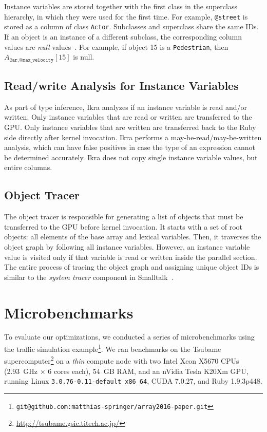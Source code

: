 \documentclass[preprint]{sigplanconf}
\begin{document}
Instance variables are stored together with the first class in the superclass hierarchy, in which they were used for the first time. For example, \texttt{@street} is stored as a column of class \texttt{Actor}. Subclasses and superclass share the same IDs. If an object is an instance of a different subclass, the corresponding column values are \emph{null} values~\cite{Mattis:2015:COI:2814228.2814230}. For example, if object 15 is a \texttt{Pedestrian}, then $A_{\texttt{Car}, \texttt{@max\_velocity}}[15]$ is null.

\subsection{Read/write Analysis for Instance Variables}
\label{sec:impl_copyback}
As part of type inference, Ikra analyzes if an instance variable is read and/or written. Only instance variables that are read or written are transferred to the GPU. Only instance variables that are written are transferred back to the Ruby side directly after kernel invocation. Ikra performs a may-be-read/may-be-written analysis, which can have false positives in case the type of an expression cannot be determined accurately. Ikra does not copy single instance variable values, but entire columns.

\subsection{Object Tracer}
\label{sec:impl_tracer}
The object tracer is responsible for generating a list of objects that must be transferred to the GPU before kernel invocation. It starts with a set of root objects: all elements of the base array and lexical variables. Then, it traverses the object graph by following all instance variables. However, an instance variable value is visited only if that variable is read or written inside the parallel section. The entire process of tracing the object graph and assigning unique object IDs is similar to the \emph{system tracer} component in Smalltalk~\cite{Krasner:1983:SBH:226}.

\section{Microbenchmarks}
To evaluate our optimizations, we conducted a series of microbenchmarks using the traffic simulation example\footnote{\texttt{git@github.com:matthias-springer/array2016-paper.git}}. We ran benchmarks on the Tsubame supercomputer\footnote{\url{http://tsubame.gsic.titech.ac.jp/}} on a \emph{thin} compute node with two Intel Xeon X5670 CPUs (2.93~GHz $\times$ 6 cores each), 54~GB RAM, and an nVidia Tesla K20Xm GPU, running Linux \texttt{3.0.76-0.11-default x86\_64}, CUDA 7.0.27, and Ruby 1.9.3p448.
\end{document}
